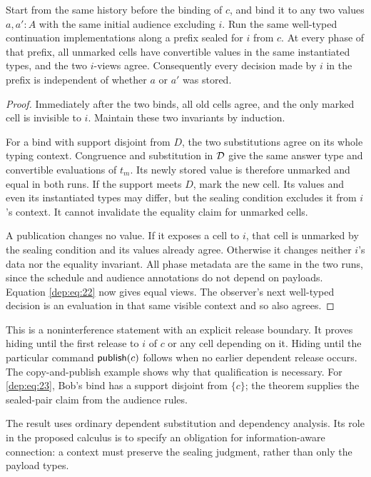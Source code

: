 \begin{theorem}
\label{thm:hiding}
Start from the same history before the binding of $c$, and bind it to any
two values $a,a':A$ with the same initial audience excluding $i$.
Run the same well-typed continuation implementations along a prefix sealed
for $i$ from $c$.
At every phase of that prefix, all unmarked cells have convertible values
in the same instantiated types, and the two $i$-views agree.
Consequently every decision made by $i$ in the prefix is independent of
whether $a$ or $a'$ was stored.
\end{theorem}
\begin{proof}
Immediately after the two binds, all old cells agree, and the only marked
cell is invisible to $i$. Maintain these two invariants by induction.

For a bind with support disjoint from $D$, the two substitutions agree on
its whole typing context. Congruence and substitution in $\mathcal D$ give the same
answer type and convertible evaluations of $t_m$. Its newly stored value is
therefore unmarked and equal in both runs. If the support meets $D$, mark
the new cell. Its values and even its instantiated types may differ, but
the sealing condition excludes it from $i$'s context. It cannot invalidate
the equality claim for unmarked cells.

A publication changes no value. If it exposes a cell to $i$, that cell is
unmarked by the sealing condition and its values already agree. Otherwise
it changes neither $i$'s data nor the equality invariant. All phase metadata
are the same in the two runs, since the schedule and audience annotations
do not depend on payloads. Equation \eqref{dep:eq:22} now gives equal views.
The observer's next well-typed decision is an evaluation in that same
visible context and so also agrees.
\end{proof}

This is a noninterference statement with an explicit release boundary.
It proves hiding until the first release to $i$ of $c$ or any cell
depending on it. Hiding until the particular command $\mathsf{publish}(c)$ follows
when no earlier dependent release occurs. The copy-and-publish example
shows why that qualification is necessary. For \eqref{dep:eq:23}, Bob's bind has a
support disjoint from $\{c\}$; the theorem supplies the sealed-pair claim
from the audience rules.

The result uses ordinary dependent substitution and dependency analysis.
Its role in the proposed calculus is to specify an obligation for
information-aware connection: a context must preserve the sealing judgment,
rather than only the payload types.

